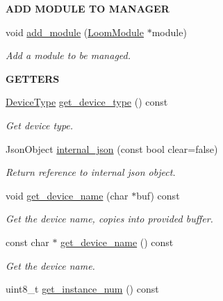 \begin{Indent}{\bf A\+DD M\+O\+D\+U\+LE TO M\+A\+N\+A\+G\+ER}\par
\begin{DoxyCompactItemize}
\item 
void \hyperlink{class_loom_manager_a4761f8b6d15ed18542d1039e207cd975}{add\+\_\+module} (\hyperlink{class_loom_module}{Loom\+Module} $\ast$module)
\begin{DoxyCompactList}\small\item\em Add a module to be managed. \end{DoxyCompactList}\end{DoxyCompactItemize}
\end{Indent}
\begin{Indent}{\bf G\+E\+T\+T\+E\+RS}\par
\begin{DoxyCompactItemize}
\item 
\hyperlink{class_loom_manager_a23170d165993ad196a7604fd08b29400}{Device\+Type} \hyperlink{class_loom_manager_a19942faf44a0835356c5d3f04ee77a66}{get\+\_\+device\+\_\+type} () const 
\begin{DoxyCompactList}\small\item\em Get device type. \end{DoxyCompactList}\item 
Json\+Object \hyperlink{class_loom_manager_a853b89aea16917b3e7baef7173ef741e}{internal\+\_\+json} (const bool clear=false)
\begin{DoxyCompactList}\small\item\em Return reference to internal json object. \end{DoxyCompactList}\item 
void \hyperlink{class_loom_manager_a93329cf2288e9467ca5da87059657a21}{get\+\_\+device\+\_\+name} (char $\ast$buf) const 
\begin{DoxyCompactList}\small\item\em Get the device name, copies into provided buffer. \end{DoxyCompactList}\item 
const char $\ast$ \hyperlink{class_loom_manager_a7642ccf7c0faca1e549f0ec2d4d72400}{get\+\_\+device\+\_\+name} () const 
\begin{DoxyCompactList}\small\item\em Get the device name. \end{DoxyCompactList}\item 
uint8\+\_\+t \hyperlink{class_loom_manager_af71c96f2e245deb12e8b25eb2e11e4db}{get\+\_\+instance\+\_\+num} () const 

\end{DoxyCompactItemize}
\end{Indent}
